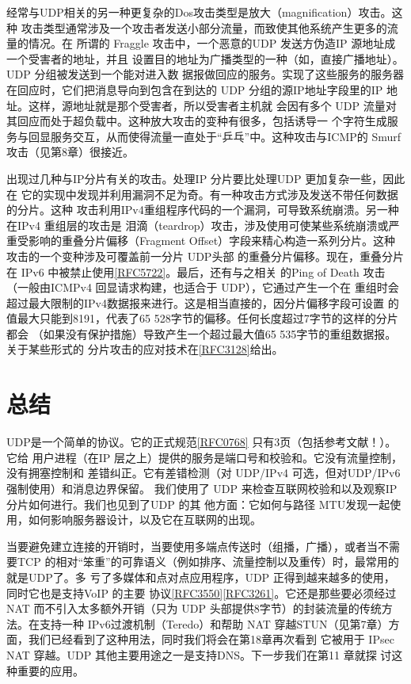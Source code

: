 经常与UDP相关的另一种更复杂的Dos攻击类型是放大（magnification）攻击。这种
攻击类型通常涉及一个攻击者发送小部分流量，而致使其他系统产生更多的流量的情况。在
所谓的 Fraggle 攻击中，一个恶意的UDP 发送方伪造IP 源地址成一个受害者的地址，并且
设置目的地址为广播类型的一种（如，直接广播地址）。UDP 分组被发送到一个能对进入数
据报做回应的服务。实现了这些服务的服务器在回应时，它们把消息导向到包含在到达的
UDP 分组的源IP地址字段里的IP 地址。这样，源地址就是那个受害者，所以受害者主机就
会因有多个 UDP 流量对其回应而处于超负载中。这种放大攻击的变种有很多，包括诱导一
个字符生成服务与回显服务交互，从而使得流量一直处于“乒乓”中。这种攻击与ICMP的
Smurf 攻击（见第8章）很接近。

出现过几种与IP分片有关的攻击。处理IP 分片要比处理UDP 更加复杂一些，因此在
它的实现中发现并利用漏洞不足为奇。有一种攻击方式涉及发送不带任何数据的分片。这种
攻击利用IPv4重组程序代码的一个漏洞，可导致系统崩溃。另一种在IPv4 重组层的攻击是
泪滴（teardrop）攻击，涉及使用可使某些系统崩溃或严重受影响的重叠分片偏移（Fragment
Offset）字段来精心构造一系列分片。这种攻击的一个变种涉及可覆盖前一分片 UDP头部
的重叠分片偏移。现在，重叠分片在 IPv6
中被禁止使用\href{https://www.rfc-editor.org/rfc/rfc5722}{[RFC5722]}。最后，还有与之相关
的Ping of Death 攻击（一般由ICMPv4 回显请求构建，也适合于 UDP），它通过产生一个在
重组时会超过最大限制的IPv4数据报来进行。这是相当直接的，因分片偏移字段可设置
的值最大只能到8191，代表了65 528字节的偏移。任何长度超过7字节的这样的分片都会
（如果没有保护措施）导致产生一个超过最大值65 535字节的重组数据报。关于某些形式的
分片攻击的应对技术在\href{https://www.rfc-editor.org/rfc/rfc3128}{[RFC3128]}给出。

\section{总结}
UDP是一个简单的协议。它的正式规范\href{https://www.rfc-editor.org/rfc/rfc0768}{[RFC0768]}
只有3页（包括参考文献！）。它给
用户进程（在IP 层之上）提供的服务是端口号和校验和。它没有流量控制，没有拥塞控制和
差错纠正。它有差错检测（对 UDP/IPv4 可选，但对UDP/IPv6强制使用）和消息边界保留。
我们使用了 UDP 来检查互联网校验和以及观察IP 分片如何进行。我们也见到了UDP 的其
他方面：它如何与路径 MTU发现一起使用，如何影响服务器设计，以及它在互联网的出现。

当要避免建立连接的开销时，当要使用多端点传送时（组播，广播），或者当不需要TCP
的相对“笨重”的可靠语义（例如排序、流量控制以及重传）时，最常用的就是UDP了。多
亏了多媒体和点对点应用程序，UDP 正得到越来越多的使用，同时它也是支持VoIP 的主要
协议\href{https://www.rfc-editor.org/rfc/rfc3550}{[RFC3550]}\href{https://www.rfc-editor.org/rfc/rfc3261}{[RFC3261]}。它还是那些要必须经过
NAT 而不引入太多额外开销（只为 UDP
头部提供8字节）的封装流量的传统方法。在支持一种 IPv6过渡机制（Teredo）和帮助 NAT
穿越STUN（见第7章）方面，我们已经看到了这种用法，同时我们将会在第18章再次看到
它被用于 IPsec NAT 穿越。UDP 其他主要用途之一是支持DNS。下一步我们在第11 章就探
讨这种重要的应用。

